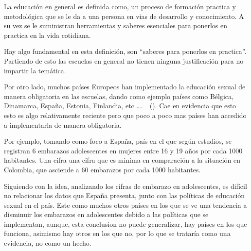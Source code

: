 \documentclass[letterpaper, 12pt]{article}
\begin{document}

La educación en general es definida como, un proceso de
formación practica y metodológica que se le da a una
persona en vias de desarrollo y conocimiento. A su vez se
le suministran herramientas y saberes esenciales para
ponerlos en practica en la vida
cotidiana.~\nocite{sánchez_2022}

Hay algo fundamental en esta definición, son ``saberes para
ponerlos en practica''. Partiendo de esto las escuelas en
general no tienen ninguna justificación para no impartir la
temática.

Por otro lado, muchos países Europeos han implementado la
educación sexual de manera obligatoria en las escuelas,
dando como ejemplo países como Bélgica, Dinamarca, España,
Estonia, Finlandia, etc
\dots.~\nocite{FundacionSexpol}~(\cite{PhotoPaísesEuropa}).
Cae en evidencia que esto esto es algo relativamente
reciente pero que poco a poco mas países han accedido a
implementarla de manera obligatoria.

\nocite{bancoMundial}

Por ejemplo, tomando como foco a España, país en el que
según estudios, se registran 6 embarazos adolescentes en
mujeres entre 16 y 19 años por cada 1000 habitantes. Una
cifra una cifra que es minima en comparación a la situación
en Colombia, que asciende a 60 embarazos por cada 1000
habitantes.

Siguiendo con la idea, analizando los cifras de embarazo en
adolescentes, es difícil no relacionar los datos que España
presenta, junto con las políticas de educación sexual en el
país. Este como muchos otros países en los que se ve una
tendencia a disminuir los embarazos en adolescentes debido
a las políticas que se implementan, aunque, esta conclusion
no puede generalizar, hay países en los que funciona,
asimismo hay otros en los que no, por lo que se trataría
como una evidencia, no como un hecho.




\newpage

\printbibliography
\end{document}
